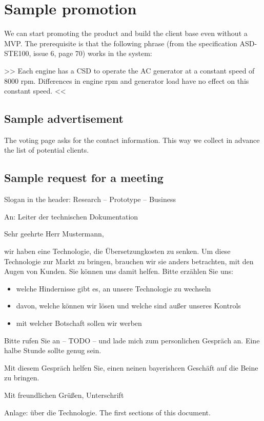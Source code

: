 \documentclass{article}
\begin{document}
\section{Sample promotion}

We can start promoting the product and build the client base even without a MVP. The prerequisite is that the following phrase (from the specification ASD-STE100, issue 6, page 70) works in the system:

>> Each engine has a CSD to operate the AC generator at a constant speed of 8000 rpm. Differences in engine rpm and generator load have no effect on this constant speed. <<

\subsection{Sample advertisement}


The voting page asks for the contact information. This way we collect in advance the list of potential clients.

\subsection{Sample request for a meeting}

Slogan in the header: Research -- Prototype -- Business

An: Leiter der technischen Dokumentation

Sehr geehrte Herr Mustermann,

wir haben eine Technologie, die Übersetzungkosten zu senken. Um diese Technologie zur Markt zu bringen, brauchen wir sie anders betrachten, mit den Augen von Kunden. Sie können uns damit helfen. Bitte erzählen Sie uns:

\begin{itemize}
\item welche Hindernisse gibt es, an unsere Technologie zu wechseln
\item davon, welche können wir lösen und welche sind außer unseres Kontrols
\item mit welcher Botschaft sollen wir werben
\end{itemize}

Bitte rufen Sie an -- TODO -- und lade mich zum personlichen Gespräch an. Eine halbe Stunde sollte genug sein.

Mit diesem Gespräch helfen Sie, einen neinen bayerishcen Geschäft auf die Beine zu bringen.

Mit freundlichen Grüßen, Unterschrift

Anlage: über die Technologie. The first sections of this document.
\end{document}
